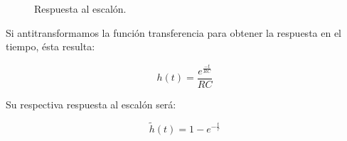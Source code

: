 \begin{figure}[H]
\qquad
{}%
\caption{Respuesta al escalón.}
\label{diagbodemedido}
\end{figure}

Si antitransformamos la función transferencia para obtener la respuesta en el tiempo, ésta resulta:
\begin{center}
\begin{equation}
\label{transf}
h(t)=\frac{e^{\frac{-t}{RC}}}{RC}
\end{equation}
\end{center}

Su respectiva respuesta al escalón será:
\begin{center}
\begin{equation}
\label{transf}
\widetilde{h}(t)=1 - e^{-\frac{t}{\tau}}
\end{equation}
\end{center}

